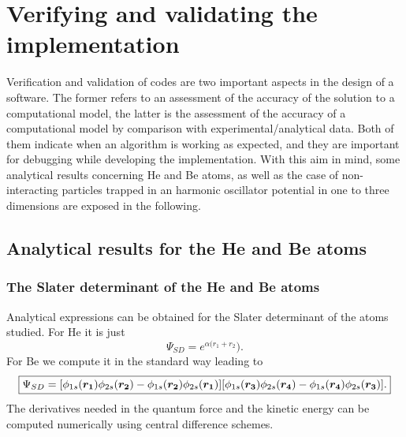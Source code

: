 \section{Verifying and validating the implementation}\label{verification}
Verification and validation of codes are two important aspects in the design of a software. The former refers to an assessment of the accuracy of the solution to a computational model, the latter is the assessment of the accuracy of a computational model by comparison with experimental/analytical data. Both of them indicate when an algorithm is working as expected, and they are important for debugging while developing the implementation. With this aim in mind, some analytical results concerning He and Be atoms, as well as the case of non-interacting particles trapped in an harmonic oscillator potential in one to three dimensions are exposed in the following.

\subsection{Analytical results for the He and Be atoms}
\subsubsection{The Slater determinant of the He and Be atoms}
Analytical expressions can be obtained for the Slater determinant of the atoms studied. For He it is just 
\begin{equation}
 \boxed{\Psi_{SD} = e^{\alpha(r_1 + r_2}).}
\end{equation}
For Be we compute it in the standard way leading to 
\begin{equation}
\boxed{\Psi_{SD} = [\phi_{1s}(\boldsymbol{r_1})\phi_{2s}(\boldsymbol{r_2}) - \phi_{1s}(\boldsymbol{r_2}) \phi_{2s}(\boldsymbol{r_1})]
	    [\phi_{1s}(\boldsymbol{r_3})\phi_{2s}(\boldsymbol{r_4}) - \phi_{1s}(\boldsymbol{r_4}) \phi_{2s}(\boldsymbol{r_3})].}
 \end{equation}
The derivatives needed in the quantum force and the kinetic energy can be computed numerically using central difference schemes. 

